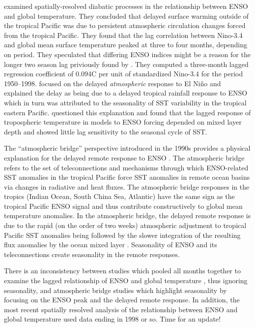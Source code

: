 \documentclass{ametsocV6.1}
\begin{document}
\citet{Trenberth2002evolution} examined spatially-resolved
    diabatic processes in the relationship between ENSO and global
    temperature. They concluded that delayed surface warming outside of the
    tropical Pacific was due to persistent atmospheric circulation
    changes forced from the tropical Pacific. They found that the lag correlation between Nino-3.4 and
    global mean surface temperature peaked at three to four months,
    depending on period. They speculated that differing ENSO indices
    might be a reason for the longer two season lag priviously found
    by \citet{Angell1981comparison}. They computed a three-month lagged regression coefficient of
    0.094\textdegree C per unit of standardized Nino-3.4 for the
    period 1950--1998. \citet{Kumar2003nature} focused on the delayed
    \textit{atmospheric} response to El Ni\~no and explained the delay
    as being due to a delayed tropical rainfall response to ENSO which
    in turn was attributed to the seasonality of SST variability in the
    tropical eastern Pacific. \citet{Su2005mechanisms} questioned this explanation and found
    that the lagged response of tropospheric temperature in models to
    ENSO forcing depended on mixed layer depth and showed little lag
    sensitivity to the seasonal cycle of SST.

  
 
  

The ``atmospheric bridge'' perspective introduced in the 1990s
    provides a physical explanation for the delayed remote response to
    ENSO \citep[see][ for a review]{Alexander2002atmospheric}. The atmospheric bridge refers to the set of teleconnections
    and mechanisms through which ENSO-related SST anomalies in the
    tropical Pacific force SST anomalies in remote ocean basins via
    changes in radiative and heat fluxes. The atmospheric bridge responses in the tropics (Indian Ocean,
    South China Sea, Atlantic) have the same sign as the tropical
    Pacific ENSO signal and thus contribute constructively to global
    mean temperature anomalies. In the atmospheric bridge, the delayed remote response is due
    to the rapid (on the order of two weeks) atmospheric adjustment to
    tropical Pacific SST anomalies being followed by the slower
    integration of the resulting flux anomalies by the ocean mixed
    layer \citep{Klein1999remote}. Seasonality of ENSO and its
    teleconnections create seasonality in the remote responses.

There is an inconsistency between studies which pooled all
    months together to examine the lagged relationship of ENSO and
    global temperature \citep[e.g.,][]{Trenberth2002evolution,
      Lean2008natural, Foster2011global}, thus ignoring seasonality,
    and atmospheric bridge studies which highlight seasonality by
    focusing on the ENSO peak and the delayed remote response. In addition, the most recent spatially resolved analysis of the
    relationship between ENSO and global temperature used data ending
    in 1998 or so. Time for an update!
\end{document}
